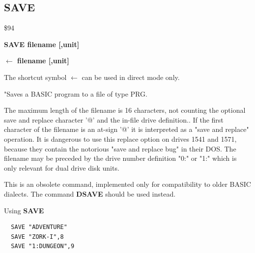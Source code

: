 \subsection{SAVE}
\begin{description}[leftmargin=2cm,style=nextline]
\item [Token:] \$94
\item [Format:] {\bf SAVE filename [,unit] }
\item [Format:] {\bf $\leftarrow$ filename [,unit] }
\item [Usage:]
   The shortcut symbol {\bf $\leftarrow$} can be used in direct mode only.

   "Saves a BASIC program to a file of type PRG.

   \filenamedefinition
   The maximum length of the filename is 16 characters,
   not counting the optional save and replace character '@'
   and the in-file drive definition..
   If the first character of the filename is an at-sign '@' it
   is interpreted as a "save and replace" operation. It is dangerous
   to use this replace option on drives 1541 and 1571, because they
   contain the notorious "save and replace bug" in their DOS.
   The filename may be preceded by the drive number definition
   "0:" or "1:" which is only relevant for dual drive disk units.

   \unitdefinition

\item [Remarks:]
   This is an obsolete command, implemented only for compatibility
   to older BASIC dialects. The command {\bf DSAVE} should be used
   instead.

\item [Example:] Using {\bf SAVE}
\begin{tcolorbox}[colback=black,coltext=white]
\verbatimfont{\codefont}
\begin{verbatim}
  SAVE "ADVENTURE"
  SAVE "ZORK-I",8
  SAVE "1:DUNGEON",9
\end{verbatim}
\end{tcolorbox}
\end{description}


\newpage
